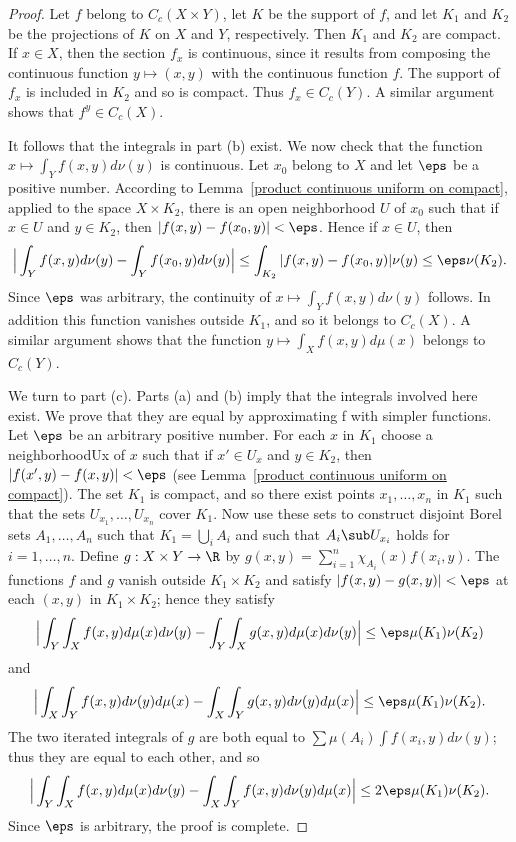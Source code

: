 \begin{proof}
Let $f$ belong to $C_c(X\times Y)$, let $K$ be the support of $f$, and let $K_1$ and $K_2$ be the projections of $K$ on $X$ and $Y$, respectively. Then $K_1$ and $K_2$ are compact. If $x\in X$, then the section $f_x$ is continuous, since it results from composing the continuous function $y\mapsto(x,y)$ with the continuous function $f$. The support of $f_x$ is included in $K_2$ and so is compact. Thus $f_x\in C_c(Y)$. A similar argument shows that $f^y\in C_c(X)$.\par
It follows that the integrals in part (b) exist. We now check that the function $x\mapsto\int_Yf(x,y)d\nu(y)$ is continuous. Let $x_0$ belong to $X$ and let $\eps$ be a positive number. According to Lemma~\ref{product continuous uniform on compact}, applied to the space $X\times K_2$, there is an open neighborhood $U$ of $x_0$ such that if $x\in U$ and $y\in K_2$, then $|f(x,y)-f(x_0,y)|<\eps$. Hence if $x\in U$, then
\begin{align*}
\Big|\int_Yf(x,y)d\nu(y)-\int_Yf(x_0,y)d\nu(y)\Big|\leq\int_{K_2}|f(x,y)-f(x_0,y)|\nu(y)\leq\eps\nu(K_2).
\end{align*}
Since $\eps$ was arbitrary, the continuity of $x\mapsto\int_Yf(x,y)d\nu(y)$ follows. In addition this function vanishes outside $K_1$, and so it belongs to $C_c(X)$. A similar argument shows that the function $y\mapsto\int_Xf(x,y)d\mu(x)$ belongs to $C_c(Y)$.\par
We turn to part (c). Parts (a) and (b) imply that the integrals involved here exist. We prove that they are equal by approximating f with simpler functions. Let $\eps$ be an arbitrary positive number. For each $x$ in $K_1$ choose a neighborhoodUx of $x$ such that if $x'\in U_x$ and $y\in K_2$, then $|f(x',y)-f(x,y)|<\eps$ (see Lemma~\ref{product continuous uniform on compact}). The set $K_1$ is compact, and so there exist points $x_1,\dots,x_n$ in $K_1$ such that the sets $U_{x_1},\dots,U_{x_n}$ cover $K_1$. Now use these sets to construct disjoint Borel sets $A_1,\dots,A_n$ such that $K_1=\bigcup_iA_i$ and such that $A_i\sub U_{x_i}$ holds for $i=1,\dots,n$. Define $g:X\times Y\to\R$ by $g(x,y)=\sum_{i
=1}^{n}\chi_{A_i}(x)f(x_i,y)$. The functions $f$ and $g$ vanish outside $K_1\times K_2$ and satisfy $|f(x,y)-g(x,y)|<\eps$ at each $(x,y)$ in $K_1\times K_2$; hence they satisfy
\[\Big|\int_Y\int_Xf(x,y)d\mu(x)d\nu(y)-\int_Y\int_Xg(x,y)d\mu(x)d\nu(y)\Big|\leq\eps\mu(K_1)\nu(K_2)\]
and
\[\Big|\int_X\int_Yf(x,y)d\nu(y)d\mu(x)-\int_X\int_Yg(x,y)d\nu(y)d\mu(x)\Big|\leq\eps\mu(K_1)\nu(K_2).\]
The two iterated integrals of $g$ are both equal to $\sum\mu(A_i)\int f(x_i,y)d\nu(y)$; thus they are equal to each other, and so
\[\Big|\int_Y\int_Xf(x,y)d\mu(x)d\nu(y)-\int_X\int_Yf(x,y)d\nu(y)d\mu(x)\Big|\leq 2\eps\mu(K_1)\nu(K_2).\]
Since $\eps$ is arbitrary, the proof is complete.
\end{proof}
